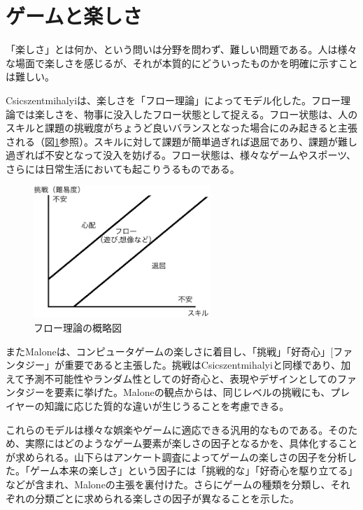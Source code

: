 \documentclass[12pt]{jsarticle}
\begin{document}
\section{ゲームと楽しさ}
「楽しさ」とは何か、という問いは分野を問わず、難しい問題である。人は様々な場面で楽しさを感じるが、それが本質的にどういったものかを明確に示すことは難しい。

Csicszentmihalyi\cite{csikszentmihalyi}は、楽しさを「フロー理論」によってモデル化した。フロー理論では楽しさを、物事に没入したフロー状態として捉える。フロー状態は、人のスキルと課題の挑戦度がちょうど良いバランスとなった場合にのみ起きると主張される（図\ref{fig:flow}参照）。スキルに対して課題が簡単過ぎれば退屈であり、課題が難し過ぎれば不安となって没入を妨げる。フロー状態は、様々なゲームやスポーツ、さらには日常生活においても起こりうるものである。

\begin{figure}[hbt]
  \begin{center}
  \includegraphics[height=5cm]{img/flow_theory.png}
  \caption{フロー理論の概略図} \label{fig:flow}
\end{center}
\end{figure}

またMalone\cite{malone}は、コンピュータゲームの楽しさに着目し、「挑戦」「好奇心」[ファンタジー」が重要であると主張した。挑戦はCsicszentmihalyiと同様であり、加えて予測不可能性やランダム性としての好奇心と、表現やデザインとしてのファンタジーを要素に挙げた。Maloneの観点からは、同じレベルの挑戦にも、プレイヤーの知識に応じた質的な違いが生じうることを考慮できる。

これらのモデルは様々な娯楽やゲームに適応できる汎用的なものである。そのため、実際にはどのようなゲーム要素が楽しさの因子となるかを、具体化することが求められる。山下ら\cite{tanosisa}はアンケート調査によってゲームの楽しさの因子を分析した。「ゲーム本来の楽しさ」という因子には「挑戦的な」「好奇心を駆り立てる」などが含まれ、Maloneの主張を裏付けた。さらにゲームの種類を分類し、それぞれの分類ごとに求められる楽しさの因子が異なることを示した。
\end{document}
